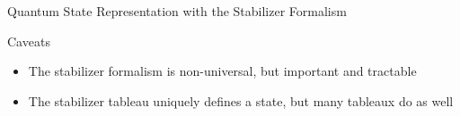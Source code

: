 \begin{frame}{Quantum State Representation with the
					\alert{Stabilizer Formalism}}
\begin{alertblock}{Caveats}
	
\vspace{-.5em}
\begin{itemize}
\item The stabilizer formalism is non-universal, \hfill but  important and tractable
\item The stabilizer tableau uniquely defines a state, \hfill but many tableaux do as well
\end{itemize}
\vspace{-.5em}

\end{alertblock}


				
\end{frame}	






